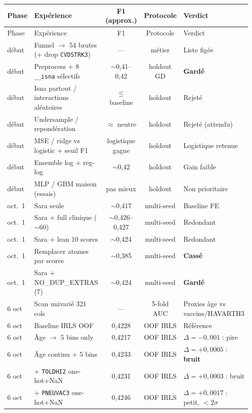\documentclass[11pt,a4paper]{article}
\begin{document}
\begin{longtable}{@{}p{2.4cm}p{5.0cm}ccp{3.8cm}@{}}
\toprule
Phase & Expérience & F1 (approx.) & Protocole & Verdict \\
\midrule
\endfirsthead
\toprule
Phase & Expérience & F1 & Protocole & Verdict \\
\midrule
\endhead

début & Funnel $\to$ 54 brutes (+ drop \texttt{CVDSTRK3}) & --- & métier & Liste figée \\
début & Preprocess + 8 \texttt{\_\_isna} sélectifs & $\sim$0{,}41--0{,}42 & holdout GD & \textbf{Gardé} \\
début & Isna partout / interactions aléatoires & $\leq$ baseline & holdout & Rejeté \\
début & Undersample / repondération & $\approx$ neutre & holdout & Rejeté (attendu) \\
début & MSE / ridge vs logistic + seuil F1 & logistique gagne & holdout & Logistique retenue \\
début & Ensemble log + reg-log & $\sim$0{,}42 & holdout & Gain faible \\
début & MLP / GBM maison (essais) & pas mieux & holdout & Non prioritaire \\
oct.\ 1 & Sara seule & $\sim$0{,}417 & multi-seed & Baseline FE \\
oct.\ 1 & Sara + full clinique ($\sim$60) & $\sim$0{,}426--0{,}427 & multi-seed & Redondant \\
oct.\ 1 & Sara + lean 10 scores & $\sim$0{,}424 & multi-seed & Redondant \\
oct.\ 1 & Remplacer atomes par scores & $\sim$0{,}385 & multi-seed & \textbf{Cassé} \\
oct.\ 1 & Sara + NO\_DUP\_EXTRAS (7) & $\sim$0{,}424 & multi-seed & \textbf{Gardé} \\
6 oct & Scan univarié 321 cols & --- & 5-fold AUC & Proxies âge vs vaccins/HAVARTH3 \\
6 oct & Baseline IRLS OOF & 0{,}4228 & OOF IRLS & Référence \\
6 oct & Âge $\to$ 5 bins only & 0{,}4217 & OOF IRLS & $\Delta=-0{,}001$ : pire \\
6 oct & Âge continu + 5 bins & 0{,}4233 & OOF IRLS & $\Delta=+0{,}0005$ : \textbf{bruit} \\
6 oct & + \texttt{TOLDHI2} one-hot+NaN & 0{,}4231 & OOF IRLS & $\Delta=+0{,}0003$ : bruit \\
6 oct & + \texttt{PNEUVAC3} one-hot+NaN & 0{,}4246 & OOF IRLS & $\Delta=+0{,}0017$ : petit, $<2\sigma$ \\

\end{longtable}
\end{document}
